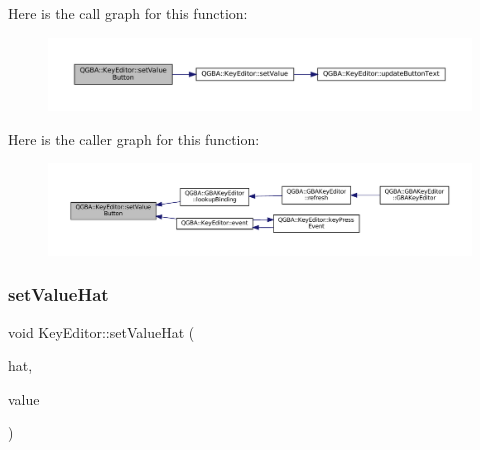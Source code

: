 Here is the call graph for this function\+:
\nopagebreak
\begin{figure}[H]
\begin{center}
\leavevmode
\includegraphics[width=350pt]{class_q_g_b_a_1_1_key_editor_ac4369964864ef0df3e9455ab444bbc3b_cgraph}
\end{center}
\end{figure}
Here is the caller graph for this function\+:
\nopagebreak
\begin{figure}[H]
\begin{center}
\leavevmode
\includegraphics[width=350pt]{class_q_g_b_a_1_1_key_editor_ac4369964864ef0df3e9455ab444bbc3b_icgraph}
\end{center}
\end{figure}
\mbox{\label{class_q_g_b_a_1_1_key_editor_a3836e2a099626c0dfe682d63960c647d}} 
\subsubsection{\texorpdfstring{set\+Value\+Hat}{setValueHat}}
{\footnotesize\ttfamily void Key\+Editor\+::set\+Value\+Hat (\begin{DoxyParamCaption}\item[{\mbox{\hyperlink{ioapi_8h_a787fa3cf048117ba7123753c1e74fcd6}{int}}}]{hat,  }\item[{\mbox{\hyperlink{class_q_g_b_a_1_1_gamepad_hat_event_ae3f20662c61b054e5344aafb9d843837}{Gamepad\+Hat\+Event\+::\+Direction}}}]{value }\end{DoxyParamCaption})\hspace{0.3cm}{\ttfamily [slot]}}

